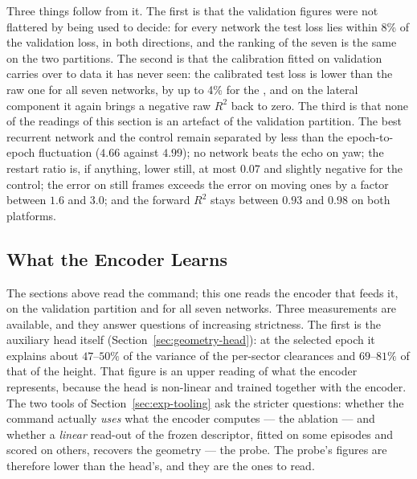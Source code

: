 Three things follow from it. The first is that the validation figures were not
flattered by being used to decide: for every network the test loss lies within
8\% of the validation loss, in both directions, and the ranking of the seven is
the same on the two partitions. The second is that the calibration fitted on
validation carries over to data it has never seen: the calibrated test loss is
lower than the raw one for all seven networks, by up to 4\% for the
, and on the lateral component it again brings a negative
raw $R^2$ back to zero. The third is that none of the readings of this section
is an artefact of the validation partition. The best recurrent network and the
control remain separated by less than the epoch-to-epoch fluctuation ($4.66$
against $4.99$); no network beats the echo on yaw; the restart ratio is, if
anything, lower still, at most $0.07$ and slightly negative for the control; the
error on still frames exceeds the error on moving ones by a factor between
$1.6$ and $3.0$; and the forward $R^2$ stays between $0.93$ and $0.98$ on both
platforms.


\subsection{What the Encoder Learns}
\label{sec:res-sl-encoder}

The sections above read the command; this one reads the encoder that feeds it,
on the validation partition and for all seven networks. Three measurements are
available, and they answer questions of increasing strictness. The first is the
auxiliary head itself (Section~\ref{sec:geometry-head}): at the selected epoch
it explains about $47$--$50\%$ of the variance of the per-sector clearances and
$69$--$81\%$ of that of the height. That figure is an upper reading of what the
encoder represents, because the head is non-linear and trained together with
the encoder. The two tools of Section~\ref{sec:exp-tooling} ask the stricter
questions: whether the command actually \emph{uses} what the encoder computes ---
the ablation --- and whether a \emph{linear} read-out of the frozen descriptor,
fitted on some episodes and scored on others, recovers the geometry --- the
probe. The probe's figures are therefore lower than the head's, and they are the
ones to read.


